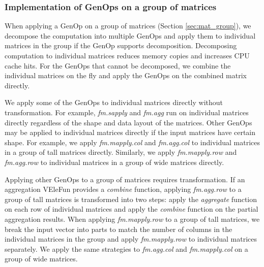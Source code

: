 

\subsubsection{Implementation of GenOps on a group of matrices} \label{sec:group_op}

When applying a GenOp on a group of matrices (Section \ref{sec:mat_group}),
we decompose the computation into multiple GenOps and apply them to individual
matrices in the group if the GenOp supports decomposition. Decomposing computation
to individual matrices reduces memory copies and increases CPU cache hits.
For the GenOps that cannot be decomposed, we combine the individual matrices
on the fly and apply the GenOps on the combined matrix directly.

We apply some of the GenOps to individual matrices directly without
transformation. For example,
\textit{fm.sapply} and \textit{fm.agg} run on individual matrices directly regardless
of the shape and data layout of the matrices. Other GenOps may be applied
to individual matrices directly if the input matrices have certain shape. For
example, we apply \textit{fm.mapply.col} and \textit{fm.agg.col} to individual
matrices in a group of tall matrices directly.  Similarly, we apply
\textit{fm.mapply.row} and \textit{fm.agg.row} to
individual matrices in a group of wide matrices directly. %

Applying other GenOps to a group of matrices requires transformation. If an aggregation
VEleFun provides a \textit{combine} function, applying \textit{fm.agg.row} to a group of
tall matrices is transformed into two steps: apply the \textit{aggregate} function on
each row of individual matrices and apply the \textit{combine} function on the partial
aggregation results. When applying \textit{fm.mapply.row} to a group of tall matrices,
we break the input vector into parts to match the number of columns in the individual
matrices in the group and apply \textit{fm.mapply.row} to individual matrices
separately. We apply the same strategies to \textit{fm.agg.col} and
\textit{fm.mapply.col} on a group of wide matrices. 

